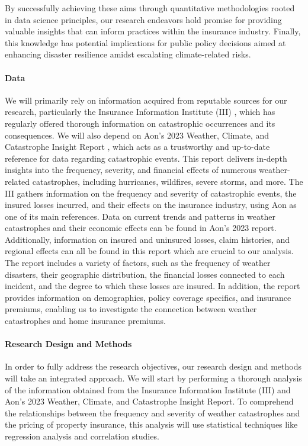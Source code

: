 \documentclass[12pt]{article}
\begin{document}
By successfully achieving these aims through quantitative methodologies rooted in data science principles, our research endeavors 
hold promise for providing valuable insights that can inform practices within the insurance industry. Finally, this knowledge has 
potential implications for public policy decisions aimed at enhancing disaster resilience amidst escalating climate-related risks.


\paragraph{Data}
We will primarily rely on information acquired from reputable sources for our research, particularly the Insurance Information 
Institute (III) \citep{iii}, which has regularly offered thorough information on catastrophic occurrences and its consequences. We will also 
depend on Aon's 2023 Weather, Climate, and Catastrophe Insight Report \citep{aon}, which acts as a trustworthy and up-to-date reference for data 
regarding catastrophic events. This report delivers in-depth insights into the frequency, severity, and financial effects of numerous 
weather-related catastrophes, including hurricanes, wildfires, severe storms, and more. The III gathers information on the frequency 
and severity of catastrophic events, the insured losses incurred, and their effects on the insurance industry, using Aon as one of 
its main references. Data on current trends and patterns in weather catastrophes and their economic effects can be found in Aon's 
2023 report. Additionally, information on insured and uninsured losses, claim histories, and regional effects can all be found in 
this report which are crucial to our analysis. The report includes a variety of factors, such as the frequency of weather disasters, 
their geographic distribution, the financial losses connected to each incident, and the degree to which these losses are insured. 
In addition, the report provides information on demographics, policy coverage specifics, and insurance premiums, enabling us to 
investigate the connection between weather catastrophes and home insurance premiums.

\paragraph{Research Design and Methods}
In order to fully address the research objectives, our research design and methods will take an integrated approach. We will start by 
performing a thorough analysis of the information obtained from the Insurance Information Institute (III) \citep{iii}and Aon's 2023 Weather, 
Climate, and Catastrophe Insight Report\citep{aon}. To comprehend the relationships between the frequency and severity of weather catastrophes 
and the pricing of property insurance, this analysis will use statistical techniques like regression analysis and correlation studies. 
\end{document}

